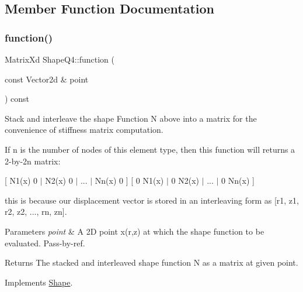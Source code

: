 \subsection{Member Function Documentation}
\mbox{\label{class_shape_q4_a306cacfd4d87384b3d06c2788cafd4ba}} 
\subsubsection{\texorpdfstring{function()}{function()}}
{\footnotesize\ttfamily Matrix\+Xd Shape\+Q4\+::function (\begin{DoxyParamCaption}\item[{const Vector2d \&}]{point }\end{DoxyParamCaption}) const\hspace{0.3cm}{\ttfamily [virtual]}}



Stack and interleave the shape Function N above into a matrix for the convenience of stiffness matrix computation. 

If n is the number of nodes of this element type, then this function will returns a 2-\/by-\/2n matrix\+:

\mbox{[} N1(x) 0 $\vert$ N2(x) 0 $\vert$ ... $\vert$ Nn(x) 0 \mbox{]} \mbox{[} 0 N1(x) $\vert$ 0 N2(x) $\vert$ ... $\vert$ 0 Nn(x) \mbox{]}

this is because our displacement vector is stored in an interleaving form as \mbox{[}r1, z1, r2, z2, ..., rn, zn\mbox{]}.


\begin{DoxyParams}{Parameters}
{\em point} & A 2D point x(r,z) at which the shape function to be evaluated. Pass-\/by-\/ref. \\
\hline
\end{DoxyParams}
\begin{DoxyReturn}{Returns}
The stacked and interleaved shape function N as a matrix at given point. 
\end{DoxyReturn}


Implements \mbox{\hyperlink{class_shape_ab6e0d64b40e09c176ce2ece24bc94a37}{Shape}}.

\mbox{\label{class_shape_q4_a5c185036352eabf489007b92f6d48ad2}} 
